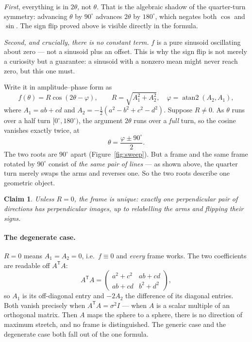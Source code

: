 \documentclass[11pt]{article}
\numberwithin{equation}{section}
\newcommand{\T}{^{\mathsf{T}}}
\theoremstyle{plainish}
\newtheorem*{claim}{Claim}
\begin{document}
\emph{First}, everything is in $2\theta$, not $\theta$. That is the algebraic
shadow of the quarter-turn symmetry: advancing $\theta$ by $90^\circ$ advances
$2\theta$ by $180^\circ$, which negates both $\cos$ and $\sin$. The sign flip
proved above is visible directly in the formula.

\emph{Second, and crucially, there is no constant term.} $f$ is a pure
sinusoid oscillating about zero --- not a sinusoid plus an offset. This is why
the sign flip is not merely a curiosity but a guarantee: a sinusoid with a
nonzero mean might never reach zero, but this one must.

Write it in amplitude--phase form as
\begin{equation}f(\theta) = R\cos(2\theta - \varphi), \qquad
R = \sqrt{A_1^2 + A_2^2}, \quad \varphi = \operatorname{atan2}(A_2, A_1),
\end{equation}
where $A_1 = ab+cd$ and $A_2 = -\tfrac12(a^2-b^2+c^2-d^2)$. Suppose $R \neq 0$.
As $\theta$ runs over a half turn $[0^\circ, 180^\circ)$, the argument $2\theta$
runs over a \emph{full} turn, so the cosine vanishes exactly twice, at
\begin{equation}\theta = \frac{\varphi \pm 90^\circ}{2}.
\end{equation}
The two roots are $90^\circ$ apart (Figure~\ref{fig:sweep}). But a frame and the same frame rotated by
$90^\circ$ consist of \emph{the same pair of lines} --- as shown above, the
quarter turn merely swaps the arms and reverses one. So the two roots describe
one geometric object.

\begin{claim}
Unless $R = 0$, the frame is unique: exactly one perpendicular pair of
directions has perpendicular images, up to relabelling the arms and flipping
their signs.
\end{claim}

\paragraph{The degenerate case.} $R = 0$ means $A_1 = A_2 = 0$, i.e.\ $f \equiv 0$
and \emph{every} frame works. The two coefficients are readable off $A\T A$:
\begin{equation}A\T A = \begin{pmatrix} a^2+c^2 & ab+cd \\ ab+cd & b^2+d^2\end{pmatrix},
\end{equation}
so $A_1$ is its off-diagonal entry and $-2A_2$ the difference of its diagonal
entries. Both vanish precisely when $A\T A = \sigma^2 I$ --- when $A$ is a
scalar multiple of an orthogonal matrix. Then $A$ maps the sphere to a sphere,
there is no direction of maximum stretch, and no frame is distinguished. The
generic case and the degenerate case both fall out of the one formula.
\end{document}
